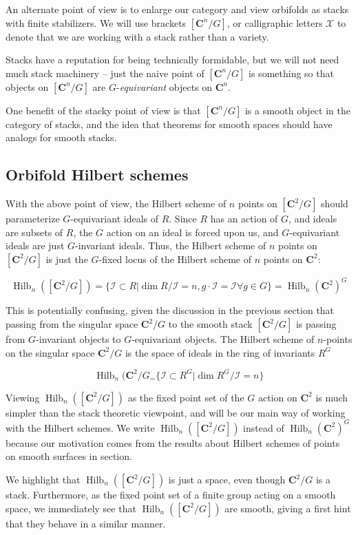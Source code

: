 \documentclass{amsart}[12pt]
\theoremstyle{definition}
\newcommand{\C}{\mathbf{C}}
\newcommand{\II}{\mathcal{I}}
\DeclareMathOperator{\Hilb}{Hilb}
\begin{document}
An alternate point of view is to enlarge our category and view orbifolds as stacks with finite stabilizers.  We will use brackets $[\C^n/G]$, or calligraphic letters $\mathcal{X}$ to denote that we are working with a stack rather than a variety.  

Stacks have a reputation for being technically formidable, but we will not need much stack machinery -- just the naive point of $[\C^n/G]$ is something so that objects on $[\C^n/G]$ are $G$-\emph{equivariant} objects on $\C^n$.  


One benefit of the stacky point of view is that $[\C^n/G]$ is a smooth object in the category of stacks, and the idea that theorems for smooth spaces should have analogs for smooth stacks.


\subsection{Orbifold Hilbert schemes}

With the above point of view, the Hilbert scheme of $n$ points on $[\C^2/G]$ should parameterize $G$-equivariant ideals of $R$.  Since $R$ has an action of $G$, and ideals are subsets of $R$, the $G$ action on an ideal is forced upon us, and $G$-equivariant ideals are just $G$-invariant ideals.  Thus, the Hilbert scheme of $n$ points on $[\C^2/G]$ is just the $G$-fixed locus of the Hilbert scheme of $n$ points on $\C^2$:

$$\Hilb_n([\C^2/G])=\{\II\subset R |\dim R/\II=n, g\cdot \II=\II\forall g\in G \} =\Hilb_n(\C^2)^G$$

This is potentially confusing, given the discussion in the previous section that passing from the singular space $\C^2/G$ to the smooth stack $[\C^2/G]$ is passing from $G$-invariant objects to $G$-equivariant objects.  The Hilbert scheme of $n$-points on the singular space $\C^2/G$ is the space of ideals in the ring of invariants $R^G$

$$\Hilb_n(\C^2/G_=\{\II\subset R^G | \dim R^G/\II=n\}$$


Viewing $\Hilb_n([\C^2/G])$ as the fixed point set of the $G$ action on $\C^2$ is much simpler than the stack theoretic viewpoint, and will be our main way of working with the Hilbert schemes.  We write $\Hilb_n([\C^2/G])$ instead of $\Hilb_n(\C^2)^G$ because our motivation comes from the results about Hilbert schemes of points on smooth surfaces in section.


We highlight that $\Hilb_n([\C^2/G])$ is just a space, even though $\C^2/G$ is a stack.  Furthermore, as the fixed point set of a finite group acting on a smooth space, we immediately see that $\Hilb_n([\C^2/G])$ are smooth, giving a first hint that they behave in a similar manner.
\end{document}
